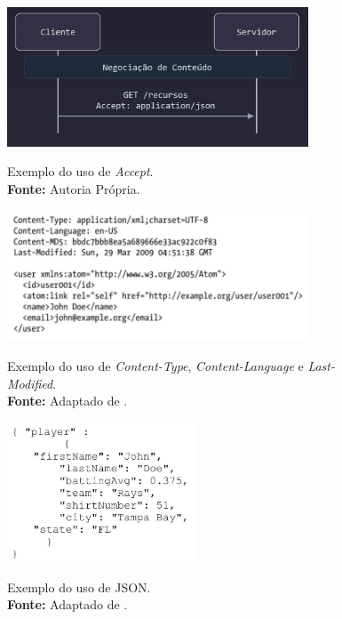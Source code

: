 \begin{figure}[!ht]
    \centering
    \caption{
        Exemplo do uso de \textit{Accept}.\\
        {\footnotesize\textbf{Fonte:} Autoria Própria.}
    }
    \includegraphics[width=0.8\textwidth]{img/Exemplo do uso de Accept.jpg}
    \label{fig:accept}
\end{figure}

\begin{figure}[H]
    \centering     
    \caption{
        Exemplo do uso de \textit{Content-Type}, \textit{Content-Language} e \textit{Last-Modified}.\\
        {\footnotesize\textbf{Fonte:} Adaptado de .}
    }
    \includegraphics[width=0.8\textwidth]{img/Exemplo do uso de Content-Type Content-Language Last-Modified.jpg}
    \label{fig:content-type-language}
\end{figure}

\begin{figure}[H]
    \centering     
    \caption{
        Exemplo do uso de JSON.\\
        {\footnotesize\textbf{Fonte:} Adaptado de .}
    }
    \includegraphics[width=0.5\textwidth]{img/Exemplo de JSON - Campos.jpg}
    \label{fig:json}
\end{figure}

